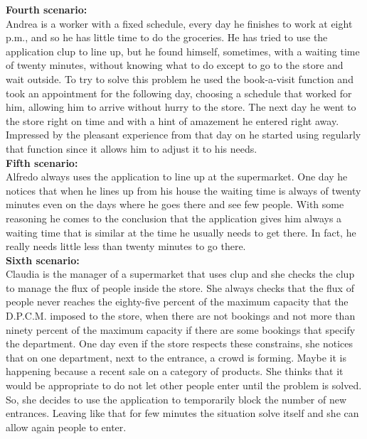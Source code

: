 \textbf{Fourth scenario:}\\
Andrea is a worker with a fixed schedule, every day he finishes to work at eight p.m., and so he has little time to do the groceries. He has tried to use the application \gls{clup} to line up, but he found himself, sometimes, with a waiting time of twenty minutes, without knowing what to do except to go to the store and wait outside. To try to solve this problem he used the book-a-visit function and took an appointment for the following day, choosing a schedule that worked for him, allowing him to arrive without hurry to the store. The next day he went to the store right on time and with a hint of amazement he entered right away. Impressed by the pleasant experience from that day on he started using regularly that function since it allows him to adjust it to his needs.\\


\textbf{Fifth scenario:}\\
Alfredo always uses the application to line up at the supermarket. One day he notices that when he lines up from his house the waiting time is always of twenty minutes even on the days where he goes there and see few people. With some reasoning he comes to the conclusion that the application gives him always a waiting time that is similar at the time he usually needs to get there. In fact, he really needs little less than twenty minutes to go there.\\


\textbf{Sixth scenario:}\\
Claudia is the manager of a supermarket that uses \gls{clup} and she checks the \gls{clup} to manage the flux of people inside the store. She always checks that the flux of people never reaches the eighty-five percent of the maximum capacity that the D.P.C.M. imposed to the store, when there are not bookings and not more than ninety percent of the maximum capacity if there are some bookings that specify the department. 
One day even if the store respects these constrains, she notices that on one department, next to the entrance, a crowd is forming. Maybe it is happening because a recent sale on a category of products. She thinks that it would be appropriate to do not let other people enter until the problem is solved. So, she decides to use the application to temporarily block the number of new entrances. Leaving like that for few minutes the situation solve itself and she can allow again people to enter.\\



